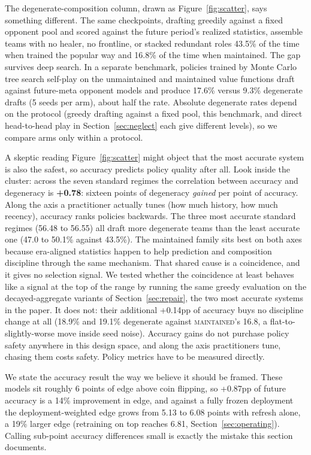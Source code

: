 \documentclass[journal]{IEEEtran}
\newcommand{\maintained}{\textsc{maintained}}          %
\begin{document}
The degenerate-composition column, drawn as
Figure~\ref{fig:scatter}, says something different. The same
checkpoints, drafting greedily against a fixed opponent pool and scored
against the future period's realized statistics, assemble teams with no
healer, no frontline, or stacked redundant roles 43.5\% of the time when
trained the popular way and 16.8\% of the time when maintained. The gap
survives deep search. In a separate benchmark, policies trained by Monte
Carlo tree search self-play on the unmaintained and maintained value
functions draft against future-meta opponent models and produce 17.6\%
versus 9.3\% degenerate drafts (5 seeds per arm), about half the rate.
Absolute degenerate rates depend on the protocol (greedy drafting
against a fixed pool, this benchmark, and direct head-to-head play in
Section~\ref{sec:neglect} each give different levels), so we compare
arms only within a protocol.

A skeptic reading Figure~\ref{fig:scatter} might object that the most
accurate system is also the safest, so accuracy predicts policy quality
after all. Look inside the cluster: across the seven standard regimes
the correlation between accuracy and degeneracy is \textbf{+0.78}:
sixteen points of degeneracy \emph{gained} per point of accuracy. Along
the axis a practitioner actually tunes (how much history, how much
recency), accuracy ranks policies backwards. The three most accurate
standard regimes (56.48 to 56.55) all draft more degenerate teams than
the least accurate one (47.0 to 50.1\% against 43.5\%). The maintained
family sits best on both axes because era-aligned statistics happen to
help prediction and composition discipline through the same mechanism.
That shared cause is a coincidence, and it gives no selection signal. We tested whether the coincidence at least behaves
like a signal at the top of the range by running the same greedy
evaluation on the decayed-aggregate variants of
Section~\ref{sec:repair}, the two most accurate systems in the paper.
It does not: their additional +0.14pp of accuracy buys no discipline
change at all (18.9\% and 19.1\% degenerate against \maintained{}'s
16.8, a flat-to-slightly-worse move inside seed noise). Accuracy gains
do not purchase policy safety anywhere in this design space, and along
the axis practitioners tune, chasing them costs safety. Policy metrics
have to be measured directly.

We state the accuracy result the way we believe it should be framed.
These models sit roughly 6 points of edge above coin flipping, so
+0.87pp of future accuracy is a 14\% improvement in edge, and against a
fully frozen deployment the deployment-weighted edge grows from 5.13 to
6.08 points with refresh alone, a 19\% larger edge (retraining on top
reaches 6.81, Section~\ref{sec:operating}). Calling sub-point accuracy
differences small is exactly the mistake this section documents.
\end{document}
